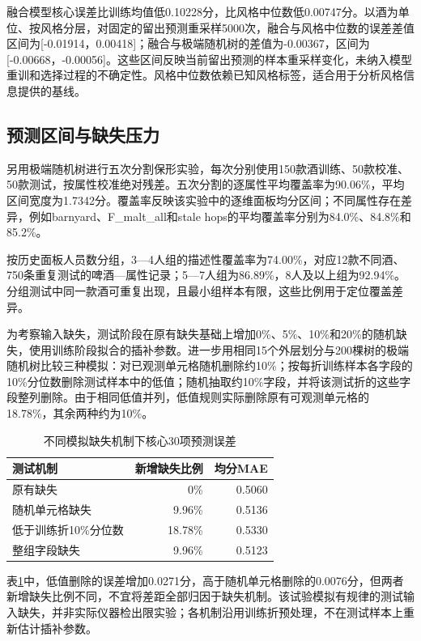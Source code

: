 \documentclass{mathorcup-journal}
\begin{document}
融合模型核心误差比训练均值低0.10228分，比风格中位数低0.00747分。以酒为单位、按风格分层，对固定的留出预测重采样5000次，融合与风格中位数的误差差值区间为[-0.01914，0.00418]；融合与极端随机树的差值为-0.00367，区间为[-0.00668，-0.00056]。这些区间反映当前留出预测的样本重采样变化，未纳入模型重训和选择过程的不确定性。风格中位数依赖已知风格标签，适合用于分析风格信息提供的基线。


\subsection{预测区间与缺失压力}

另用极端随机树进行五次分割保形实验，每次分别使用150款酒训练、50款校准、50款测试，按属性校准绝对残差。五次分割的逐属性平均覆盖率为90.06\%，平均区间宽度为1.7342分。覆盖率反映该实验中的逐维面板均分区间；不同属性存在差异，例如barnyard、F\_malt\_all和stale hops的平均覆盖率分别为84.0\%、84.8\%和85.2\%。


按历史面板人员数分组，3—4人组的描述性覆盖率为74.00\%，对应12款不同酒、750条重复测试的啤酒—属性记录；5—7人组为86.89\%，8人及以上组为92.94\%。分组测试中同一款酒可重复出现，且最小组样本有限，这些比例用于定位覆盖差异。


为考察输入缺失，测试阶段在原有缺失基础上增加0\%、5\%、10\%和20\%的随机缺失，使用训练阶段拟合的插补参数。进一步用相同15个外层划分与200棵树的极端随机树比较三种模拟：对已观测单元格随机删除约10\%；按每折训练样本各字段的10\%分位数删除测试样本中的低值；随机抽取约10\%字段，并将该测试折的这些字段整列删除。由于相同低值并列，低值规则实际删除原有可观测单元格的18.78\%，其余两种约为10\%。

\begin{table}[t]
\centering\small
\caption{不同模拟缺失机制下核心30项预测误差}\label{tab:missing}
\begin{tabular}{lrr}
\toprule
测试机制 & 新增缺失比例 & 均分MAE\\
\midrule
原有缺失 & 0\% & 0.5060\\
随机单元格缺失 & 9.96\% & 0.5136\\
低于训练折10\%分位数 & 18.78\% & 0.5330\\
整组字段缺失 & 9.96\% & 0.5123\\
\bottomrule
\end{tabular}
\end{table}

表\ref{tab:missing}中，低值删除的误差增加0.0271分，高于随机单元格删除的0.0076分，但两者新增缺失比例不同，不宜将差距全部归因于缺失机制。该试验模拟有规律的测试输入缺失，并非实际仪器检出限实验；各机制沿用训练折预处理，不在测试样本上重新估计插补参数。
\end{document}
